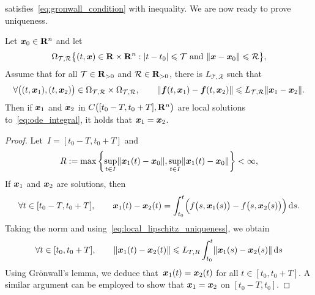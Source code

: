 satisfies~\eqref{eq:gronwall_condition} with inequality.
We are now ready to prove uniqueness.
\begin{theorem}
    \label{theorem:uniqueness}
    Let $\mathbf{\boldsymbol{x}}_0 \in \mathbf R^n$ and let
    \[
        \Omega_{\mathcal T, \mathcal R}
        \bigl\{(t, \mathbf{\boldsymbol{x}}) \in \mathbf R \times \mathbf R^n: \lvert t - t_0\rvert \leqslant \mathcal T \text{ and } \lVert\mathbf{\boldsymbol{x}} - \mathbf{\boldsymbol{x}}_0\rVert \leqslant \mathcal R \bigr\},
    \]
    Assume that for all $\mathcal T \in \mathbf R_{>0}$ and $\mathcal R \in \mathbf R_{>0}$,
    there is $L_{\mathcal T,  \mathcal R}$ such that
    \begin{equation}
        \label{eq:local_lipschitz_uniqueness}
        \forall \bigl((t, \mathbf{\boldsymbol{x}}_1), (t, \mathbf{\boldsymbol{x}}_2)\bigr) \in \Omega_{\mathcal T, \mathcal R} \times \Omega_{\mathcal T, \mathcal R}, \qquad
        \lVert \mathbf{\boldsymbol{f}}(t, \mathbf{\boldsymbol{x}}_1) - \mathbf{\boldsymbol{f}}(t, \mathbf{\boldsymbol{x}}_2) \rVert \leqslant L_{\mathcal T, \mathcal R} \lVert\mathbf{\boldsymbol{x}}_1 - \mathbf{\boldsymbol{x}}_2\rVert.
    \end{equation}
    Then if $\mathbf{\boldsymbol{x}}_1$ and $\mathbf{\boldsymbol{x}}_2$ in $C\bigl([t_0 - T, t_0 + T], \mathbf R^n\bigr)$ are local solutions to~\eqref{eq:ode_integral},
    it holds that $\mathbf{\boldsymbol{x}}_1 = \mathbf{\boldsymbol{x}}_2$.
\end{theorem}
\begin{proof}
    Let~$I = [t_0 - T, t_0 + T]$ and
    \[
        R := \max \left\{ \sup_{t \in I} \lVert\mathbf{\boldsymbol{x}}_1(t) - \mathbf{\boldsymbol{x}}_0\rVert,   \sup_{t \in I} \lVert\mathbf{\boldsymbol{x}}_1(t) - \mathbf{\boldsymbol{x}}_0\rVert \right\} < \infty,
    \]
    If $\mathbf{\boldsymbol{x}}_1$ and $\mathbf{\boldsymbol{x}}_2$ are solutions,
    then
    \[
        \forall t \in [t_0 - T, t_0 + T], \qquad
        \mathbf{\boldsymbol{x}}_1(t) - \mathbf{\boldsymbol{x}}_2(t) = \int_{t_0}^{t} \Bigl( f\bigl(s, \mathbf{\boldsymbol{x}}_1(s)\bigr) - f\bigl(s, \mathbf{\boldsymbol{x}}_2(s)\bigr) \Bigr)  \, \mathrm d s.
    \]
    Taking the norm and using~\eqref{eq:local_lipschitz_uniqueness},
    we obtain
    \[
        \forall t \in [t_0, t_0 + T], \qquad
        \lVert\mathbf{\boldsymbol{x}}_1(t) - \mathbf{\boldsymbol{x}}_2(t)\rVert \leqslant L_{T,R} \int_{t_0}^{t} \lVert\mathbf{\boldsymbol{x}}_1(s) - \mathbf{\boldsymbol{x}}_2(s)\rVert \, \mathrm d s
    \]
    Using Gr\"onwall's lemma,
    we deduce that~$\mathbf{\boldsymbol{x}}_1(t) = \mathbf{\boldsymbol{x}}_2(t)$ for all $t \in [t_0, t_0 + T]$.
    A similar argument can be employed to show that $\mathbf{\boldsymbol{x}}_1 = \mathbf{\boldsymbol{x}}_2$ on $[t_0 - T, t_0]$.
\end{proof}

